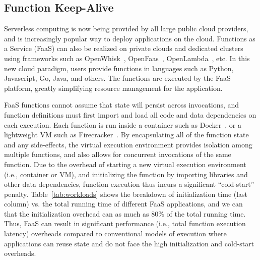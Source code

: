 

\subsection{Function Keep-Alive}
\vspace*{\subsecspace}

Serverless computing is now being provided by all large public cloud providers, and 
is increasingly popular way to deploy applications on the cloud.  
Functions as a Service (FaaS) can also be realized on private clouds and dedicated clusters using frameworks such as OpenWhisk~\cite{openwhisk}, OpenFaas~\cite{openfaas},  OpenLambda~\cite{hendrickson2016serverless}, etc. 
In this new cloud paradigm, users provide functions in languages such as Python, Javascript, Go, Java, and others. 
The functions are executed by the FaaS platform, greatly simplifying resource management for the application. 





%
%
FaaS functions cannot assume that state will persist across invocations, and function definitions must first import and load all code and data dependencies on each execution. 
Each function is run inside a container such as Docker~\cite{docker-main}, or a lightweight VM such as Firecracker~\cite{firecracker-nsdi20}. 
By encapsulating all of the function state and any side-effects, the virtual execution environment provides isolation among multiple functions, and also allows for concurrent invocations of the same function. 
Due to the overhead of starting a new virtual execution environment (i.e., container or VM), and initializing the function by importing libraries and other data dependencies, function execution thus incurs a significant ``cold-start'' penalty.
Table~\ref{tab:workloads} shows the breakdown of initialization time (last column) vs. the total running time of different FaaS applications, and we can that the initialization overhead can as much as 80\% of the total running time. 
Thus, FaaS can result in significant performance (i.e., total function execution latency) overheads compared to conventional models of execution where applications can reuse state and do not face the high initialization and cold-start overheads. 



